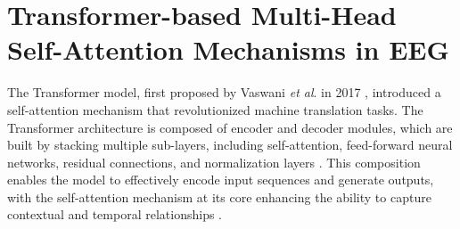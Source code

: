\documentclass[preprint,12pt]{elsarticle}
\newcommand{\etal}{\textit{et al}. }
\begin{document}
\section{Transformer-based Multi-Head Self-Attention Mechanisms in EEG}

\begin{table*}[]
\centering
\caption{Transformer-based embedding methods in the literature.}
\label{tab:table12}
\end{table*}

The Transformer model, first proposed by Vaswani \etal in 2017 \cite{vaswani2017attention}, introduced a self-attention mechanism that revolutionized machine translation tasks. The Transformer architecture is composed of encoder and decoder modules, which are built by stacking multiple sub-layers, including self-attention, feed-forward neural networks, residual connections, and normalization layers \cite{vaswani2017attention,devlin2018bert}. This composition enables the model to effectively encode input sequences and generate outputs, with the self-attention mechanism at its core enhancing the ability to capture contextual and temporal relationships \cite{kobayashi2020attention}.
\end{document}
